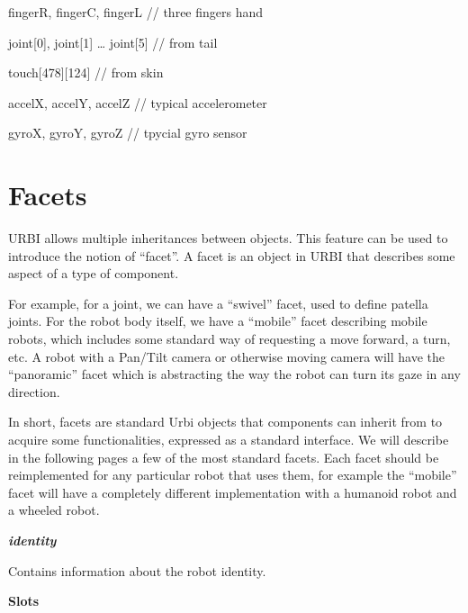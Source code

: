 \documentclass[a4paper]{article}
\begin{document}
{
fingerR, fingerC, fingerL // three fingers hand}

{
joint[0], joint[1] … joint[5] // from tail}

{
touch[478][124] // from skin}

{
accelX, accelY, accelZ // typical accelerometer}

{
gyroX, gyroY, gyroZ // tpycial gyro sensor}

\section[]{ }
\section[Facets]{ Facets}
{\sffamily
URBI allows multiple inheritances between objects. This feature can be
used to introduce the notion of “facet”. A facet is an object in URBI
that describes some aspect of a type of component. }

{\sffamily
For example, for a joint, we can have a “swivel” facet, used to define
patella joints. For the robot body itself, we have a “mobile” facet
describing mobile robots, which includes some standard way of
requesting a move forward, a turn, etc. A robot with a Pan/Tilt camera
or otherwise moving camera will have the “panoramic” facet which is
abstracting the way the robot can turn its gaze in any direction.}

{\sffamily
In short, facets are standard Urbi objects that components can inherit
from to acquire some functionalities, expressed as a standard
interface. We will describe in the following pages a few of the most
standard facets. Each facet should be reimplemented for any particular
robot that uses them, for example the “mobile” facet will have a
completely different implementation with a humanoid robot and a wheeled
robot.}

{\sffamily\bfseries\itshape
identity}

{\sffamily
Contains information about the robot identity. }

{\sffamily\bfseries
Slots}
\end{document}
